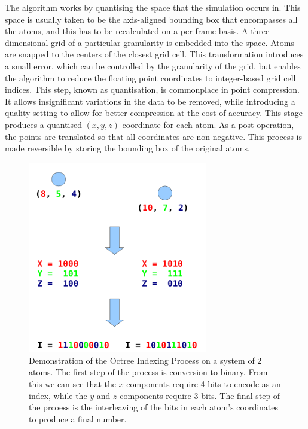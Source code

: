 \documentclass[a4paper,11pt]{report}
\begin{document}
The algorithm works by quantising the space that the simulation occurs in. This space is usually taken to be the axis-aligned bounding box that encompasses all the atoms, and this has to be recalculated on a per-frame basis. A three dimensional grid of a particular granularity is embedded into the space. Atoms are snapped to the centers of the closest grid cell. This transformation introduces a small error, which can be controlled by the granularity of the grid, but enables the algorithm to reduce the floating point coordinates to integer-based grid cell indices. This step, known as quantisation, is commonplace in point compression. It allows insignificant variations in the data to be removed, while introducing a quality setting to allow for better compression at the cost of accuracy. This stage produces a quantised $(x, y, z)$ coordinate for each atom. As a post operation, the points are translated so that all coordinates are non-negative. This process is made reversible by storing the bounding box of the original atoms.

\begin{figure}[!h]
 \center
 \includegraphics[width=0.7\textwidth]{resources/OctreeIndexingVerticalCropped.png}
\caption{Demonstration of the Octree Indexing Process on a system of 2 atoms. The first step of the process is conversion to binary. From this we can see that the $x$ components require 4-bits to encode as an index, while the $y$ and $z$ components require 3-bits. The final step of the prcoess is the interleaving of the bits in each atom's coordinates to produce a final number. }
\label{octree}
\end{figure}
\end{document}
